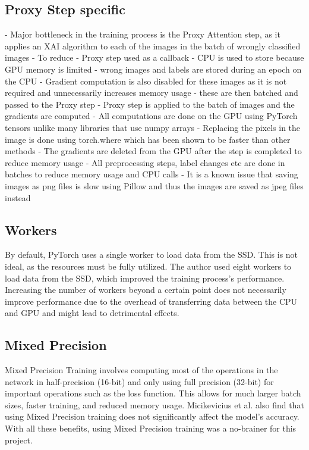 \subsection{Proxy Step specific}
- Major bottleneck in the training process is the Proxy Attention step, as it applies an XAI algorithm to each of the images in the batch of wrongly classified images
- To reduce 
    - Proxy step used as a callback
    - CPU is used to store because GPU memory is limited
    - wrong images and labels are stored during an epoch on the CPU
    - Gradient computation is also disabled for these images as it is not required and unnecessarily increases memory usage
    - these are then batched and passed to the Proxy step
    - Proxy step is applied to the batch of images and the gradients are computed
    - All computations are done on the GPU using PyTorch tensors unlike many libraries that use numpy arrays
    - Replacing the pixels in the image is done using torch.where which has been shown to be faster than other methods 
    - The gradients are deleted from the GPU after the step is completed to reduce memory usage
    - All preprocessing steps, label changes etc are done in batches to reduce memory usage and CPU calls
    - It is a known issue that saving images as png files is slow using Pillow and thus the images are saved as jpeg files instead 

\subsection{Workers}
By default, PyTorch uses a single worker to load data from the SSD. This is not ideal, as the resources must be fully utilized. The author used eight workers to load data from the SSD, which improved the training process's performance. Increasing the number of workers beyond a certain point does not necessarily improve performance due to the overhead of transferring data between the CPU and GPU and might lead to detrimental effects.

\subsection{Mixed Precision}
Mixed Precision Training \cite{micikeviciusMixedPrecisionTraining2017} involves computing most of the operations in the network in half-precision (16-bit) and only using full precision (32-bit) for important operations such as the loss function. This allows for much larger batch sizes, faster training, and reduced memory usage. Micikevicius et al. also find that using Mixed Precision training does not significantly affect the model's accuracy. With all these benefits, using Mixed Precision training was a no-brainer for this project.

